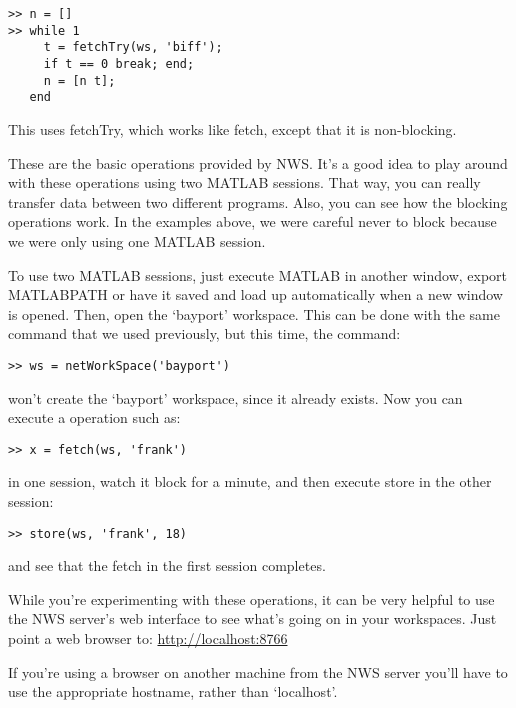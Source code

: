 \begin{samepage}
\begin{verbatim}
>> n = []
>> while 1
     t = fetchTry(ws, 'biff');
     if t == 0 break; end;
     n = [n t];
   end
\end{verbatim}
\end{samepage}

This uses fetchTry, which works like fetch, except that it is
non-blocking.

These are the basic operations provided by NWS.  It's a good idea to
play around with these operations using two MATLAB sessions.  That way,
you can really transfer data between two different programs.  Also, you
can see how the blocking operations work.  In the examples above, we
were careful never to block because we were only using one MATLAB
session.

To use two MATLAB sessions, just execute MATLAB in another window,
export MATLABPATH or have it saved and load up automatically when a new
window is opened.  Then, open the `bayport' workspace.  This can be done
with the same command that we used previously, but this time, the
command:

\begin{verbatim}
>> ws = netWorkSpace('bayport')
\end{verbatim}

won't create the `bayport' workspace, since it already exists.  Now you
can execute a operation such as:

\begin{verbatim}
>> x = fetch(ws, 'frank')
\end{verbatim}

in one session, watch it block for a minute, and then execute store in
the other session:

\begin{verbatim}
>> store(ws, 'frank', 18)
\end{verbatim}

and see that the fetch in the first session completes.

While you're experimenting with these operations, it can be very helpful
to use the NWS server's web interface to see what's going on in your
workspaces. Just point a web browser to: \url{http://localhost:8766}

If you're using a browser on another machine from the NWS server you'll
have to use the appropriate hostname, rather than `localhost'.
